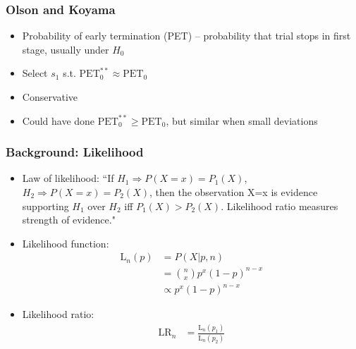 \documentclass{beamer}\usepackage[]{graphicx}\usepackage[]{color}
\begin{document}
\begin{frame}
\frametitle{Olson and Koyama}
    \begin{itemize}
        \item Probability of early termination (PET) -- probability that trial stops in first stage, usually under $H_0$
        \item Select $s_1$ s.t. $\mbox{PET}_0^{\ast\ast} \approx \mbox{PET}_0$ 
        \item Conservative
        \item Could have done $\mbox{PET}_0^{\ast\ast} \geq \mbox{PET}_0$, but similar when small deviations
    \end{itemize}
\end{frame}

\begin{frame}
\frametitle{Background: Likelihood}
    \begin{itemize}
        \item Law of likelihood: ``If $H_1 \Rightarrow P(X=x) = P_1(X)$, $H_2 \Rightarrow P(X=x)=P_2(X)$, then the observation X=x is evidence supporting $H_1$ over $H_2$ iff $P_1(X) > P_2(X)$. Likelihood ratio measures strength of evidence." 
        \item Likelihood function: 
\begin{equation}
\begin{aligned}
\mbox{L}_n(p) &= P(X \vert p, n) \\
&= {n \choose x} p^x (1-p)^{n-x} \\
& \propto p^x (1-p)^{n-x}
\end{aligned}
\end{equation}
      \item Likelihood ratio:
\begin{equation}
\begin{aligned}
\mbox{LR}_n & = \frac{\mbox{L}_n(p_1)}{\mbox{L}_n(p_2)}  \\
\end{aligned}
\end{equation}
    \end{itemize}
\end{frame}
\end{document}
